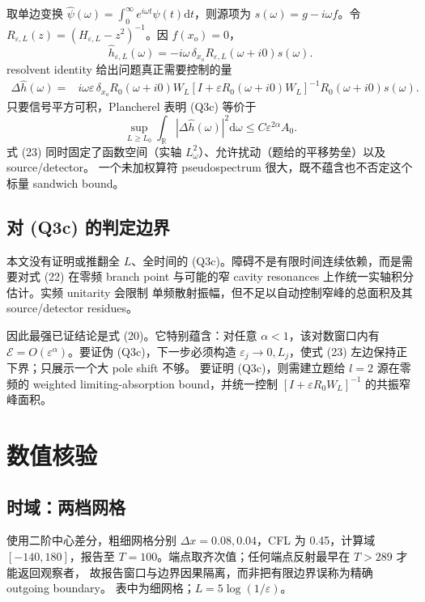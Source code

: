 \documentclass[UTF8,11pt,a4paper]{ctexart}
\theoremstyle{definition}
\newcommand{\E}{\mathcal E}
\newcommand{\dd}{\mathrm d}
\newcommand{\eps}{\varepsilon}
\newcommand{\om}{\omega}
\begin{document}
取单边变换 $\widehat\psi(\om)=\int_0^\infty e^{i\om t}\psi(t)\dd t$，则源项为
$s(\om)=g-i\om f$。令
$R_{\eps,L}(z)=(H_{\eps,L}-z^2)^{-1}$。因 $f(x_o)=0$，
\begin{equation}
\widehat h_{\eps,L}(\om)=-i\om\,\delta_{x_o}
R_{\eps,L}(\om+i0)s(\om).                                 \tag{21}
\end{equation}
resolvent identity 给出问题真正需要控制的量
\begin{align}
\Delta\widehat h(\om)
={}&i\om\eps\,\delta_{x_o}R_0(\om+i0)W_L
[I+\eps R_0(\om+i0)W_L]^{-1}R_0(\om+i0)s(\om).             \tag{22}
\end{align}
只要信号平方可积，Plancherel 表明 (Q3c) 等价于
\begin{equation}
\sup_{L\ge L_0}\int_{\mathbb R}|\Delta\widehat h(\om)|^2\dd\om
\le C\eps^{2\alpha}A_0.                                   \tag{23}
\end{equation}
式 (23) 同时固定了函数空间（实轴 $L^2_\om$）、允许扰动（题给的平移势垒）以及 source/detector。
一个未加权算符 pseudospectrum 很大，既不蕴含也不否定这个标量 sandwich bound。

\subsection{对 (Q3c) 的判定边界}

本文没有证明或推翻全 $L$、全时间的 (Q3c)。障碍不是有限时间连续依赖，而是需要对式 (22)
在零频 branch point 与可能的窄 cavity resonances 上作统一实轴积分估计。实频 unitarity 会限制
单频散射振幅，但不足以自动控制窄峰的总面积及其 source/detector residues。

因此最强已证结论是式 (20)。它特别蕴含：对任意 $\alpha<1$，该对数窗口内有
$\E=O(\eps^\alpha)$。要证伪 (Q3c)，下一步必须构造
$\eps_j\to0,L_j$，使式 (23) 左边保持正下界；只展示一个大 pole shift 不够。
要证明 (Q3c)，则需建立题给 $l=2$ 源在零频的 weighted limiting-absorption bound，并统一控制
$[I+\eps R_0W_L]^{-1}$ 的共振窄峰面积。

\section{数值核验}

\subsection{时域：两档网格}

使用二阶中心差分，粗细网格分别 $\Delta x=0.08,0.04$，CFL 为 0.45，计算域
$[-140,180]$，报告至 $T=100$。端点取齐次值；任何端点反射最早在 $T>289$ 才能返回观察者，
故报告窗口与边界因果隔离，而非把有限边界误称为精确 outgoing boundary。
表中为细网格；$L=5\log(1/\eps)$。
\end{document}
